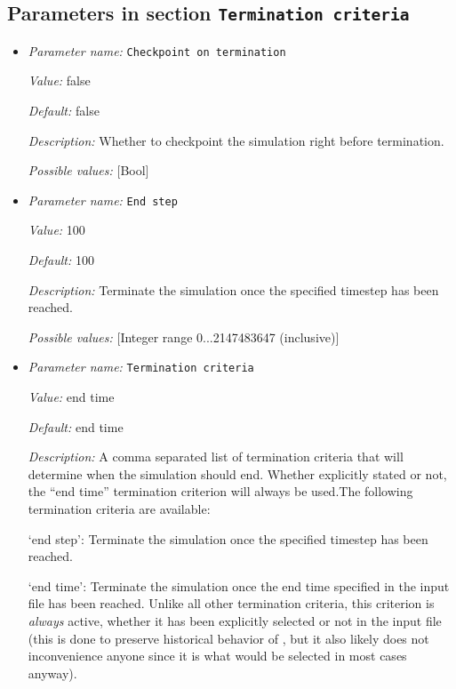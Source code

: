 \subsection{Parameters in section \tt Termination criteria}
\label{parameters:Termination_20criteria}

\begin{itemize}
\item {\it Parameter name:} {\tt Checkpoint on termination}


{\it Value:} false


{\it Default:} false


{\it Description:} Whether to checkpoint the simulation right before termination.


{\it Possible values:} [Bool]
\item {\it Parameter name:} {\tt End step}


{\it Value:} 100


{\it Default:} 100


{\it Description:} Terminate the simulation once the specified timestep has been reached.


{\it Possible values:} [Integer range 0...2147483647 (inclusive)]
\item {\it Parameter name:} {\tt Termination criteria}


{\it Value:} end time


{\it Default:} end time


{\it Description:} A comma separated list of termination criteria that will determine when the simulation should end. Whether explicitly stated or not, the ``end time'' termination criterion will always be used.The following termination criteria are available:

`end step': Terminate the simulation once the specified timestep has been reached. 

`end time': Terminate the simulation once the end time specified in the input file has been reached. Unlike all other termination criteria, this criterion is \textit{always} active, whether it has been explicitly selected or not in the input file (this is done to preserve historical behavior of \aspect{}, but it also likely does not inconvenience anyone since it is what would be selected in most cases anyway).


\end{itemize}
